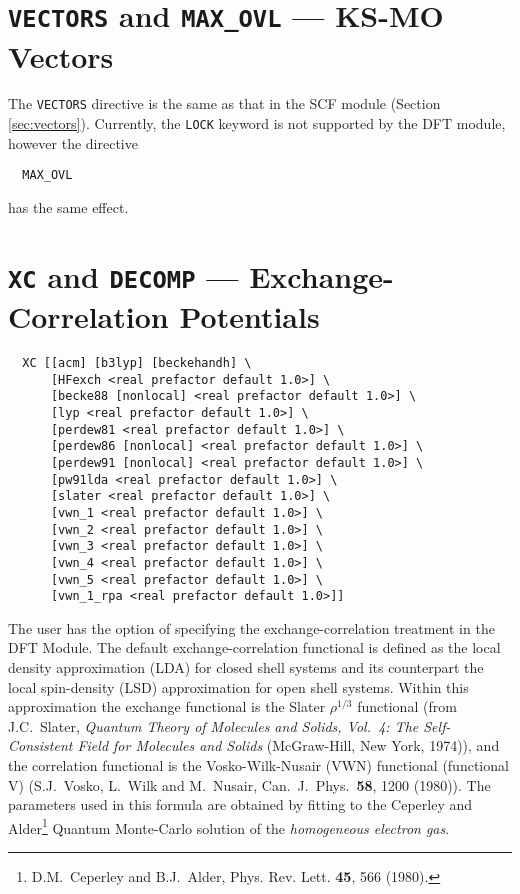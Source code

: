 \section{{\tt VECTORS} and {\tt MAX\_OVL} --- KS-MO Vectors}

The \verb+VECTORS+ directive is the same as that in the SCF module
(Section \ref{sec:vectors}).  Currently, the \verb+LOCK+ keyword
is not supported by the DFT module, however the directive
\begin{verbatim}
  MAX_OVL
\end{verbatim}
has the same effect.

\section{{\tt XC} and {\tt DECOMP} --- Exchange-Correlation Potentials}
\begin{verbatim}
  XC [[acm] [b3lyp] [beckehandh] \
      [HFexch <real prefactor default 1.0>] \
      [becke88 [nonlocal] <real prefactor default 1.0>] \
      [lyp <real prefactor default 1.0>] \
      [perdew81 <real prefactor default 1.0>] \
      [perdew86 [nonlocal] <real prefactor default 1.0>] \
      [perdew91 [nonlocal] <real prefactor default 1.0>] \
      [pw91lda <real prefactor default 1.0>] \
      [slater <real prefactor default 1.0>] \
      [vwn_1 <real prefactor default 1.0>] \
      [vwn_2 <real prefactor default 1.0>] \
      [vwn_3 <real prefactor default 1.0>] \
      [vwn_4 <real prefactor default 1.0>] \
      [vwn_5 <real prefactor default 1.0>] \
      [vwn_1_rpa <real prefactor default 1.0>]]
\end{verbatim}

The user has the option of specifying the exchange-correlation
treatment in the DFT Module.  The default exchange-correlation
functional is defined as the local density approximation (LDA) for
closed shell systems and its counterpart the local spin-density (LSD)
approximation for open shell systems.  Within this approximation the
exchange functional is the Slater $\rho^{1/3}$ functional (from
J.C.~Slater, {\sl Quantum Theory of Molecules and Solids, Vol.~4: The
  Self-Consistent Field for Molecules and Solids} (McGraw-Hill, New
York, 1974)), and the correlation functional is the Vosko-Wilk-Nusair
(VWN) functional (functional V) (S.J.~Vosko, L.~Wilk and M.~Nusair,
Can.~J.~Phys.~{\bf 58}, 1200 (1980)).  The parameters used in this
formula are obtained by fitting to the Ceperley and
Alder\footnote{D.M.~Ceperley and B.J.~Alder, Phys. Rev. Lett. {\bf
    45}, 566 (1980).}
Quantum Monte-Carlo solution of the {\em
  homogeneous electron gas}.

